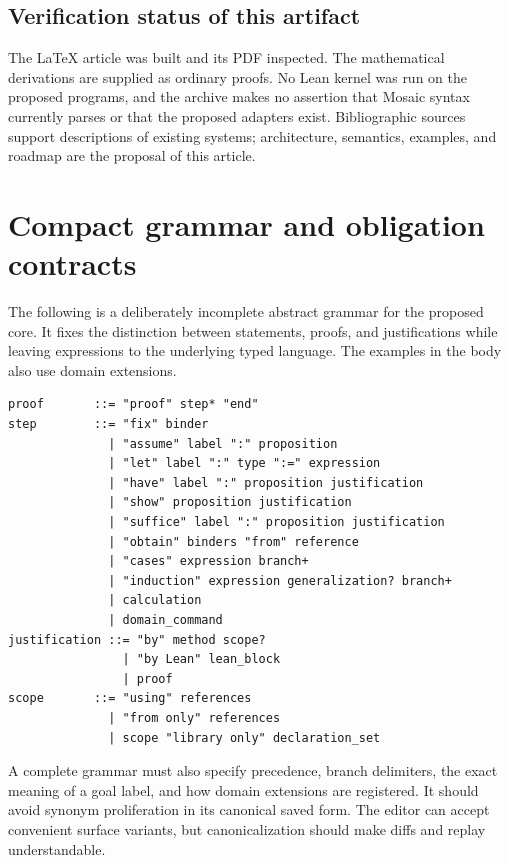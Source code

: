 \documentclass[11pt,a4paper]{article}
\theoremstyle{definition}
\theoremstyle{remark}
\begin{document}
\subsection*{Verification status of this artifact}
The LaTeX article was built and its PDF inspected. The mathematical derivations are supplied as ordinary proofs. No Lean kernel was run on the proposed programs, and the archive makes no assertion that Mosaic syntax currently parses or that the proposed adapters exist. Bibliographic sources support descriptions of existing systems; architecture, semantics, examples, and roadmap are the proposal of this article.

\section{Compact grammar and obligation contracts}
\label{app:grammar}
The following is a deliberately incomplete abstract grammar for the proposed core. It fixes the distinction between statements, proofs, and justifications while leaving expressions to the underlying typed language. The examples in the body also use domain extensions.
\begin{lstlisting}
proof       ::= "proof" step* "end"
step        ::= "fix" binder
              | "assume" label ":" proposition
              | "let" label ":" type ":=" expression
              | "have" label ":" proposition justification
              | "show" proposition justification
              | "suffice" label ":" proposition justification
              | "obtain" binders "from" reference
              | "cases" expression branch+
              | "induction" expression generalization? branch+
              | calculation
              | domain_command
justification ::= "by" method scope?
                | "by Lean" lean_block
                | proof
scope       ::= "using" references
              | "from only" references
              | scope "library only" declaration_set
\end{lstlisting}

A complete grammar must also specify precedence, branch delimiters, the exact meaning of a goal label, and how domain extensions are registered. It should avoid synonym proliferation in its canonical saved form. The editor can accept convenient surface variants, but canonicalization should make diffs and replay understandable.
\end{document}
